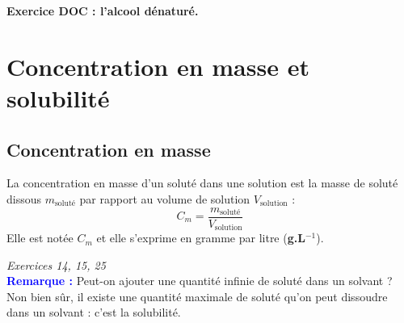\begin{Large}
\end{Large}\textbf{Exercice DOC : l'alcool dénaturé.}

\section{Concentration en masse et solubilité}
\subsection{Concentration en masse}
\begin{tcolorbox}[colback=green!5!white,colframe=green!75!black,title=\textbf{Définition}]
La concentration en masse d’un soluté dans une 
solution est la masse de soluté dissous $m_{\text{soluté}}$ par rapport au volume de solution $V_{\text{solution}}$ :
\begin{equation*}
    C_m = \frac{m_{\text{soluté}}}{V_{\text{solution}}}
\end{equation*}
Elle est notée $C_m$ et elle s’exprime en gramme par litre (\textbf{g.L$^{-1}$}).
\end{tcolorbox}

\begin{Large}
\end{Large}\textit{Exercices 14, 15, 25}\\

\textcolor{blue}{\textbf{Remarque :}} Peut-on ajouter une quantité infinie de soluté dans un solvant ? Non bien sûr, il existe une quantité maximale de soluté qu'on peut dissoudre dans un solvant : c'est la solubilité.
